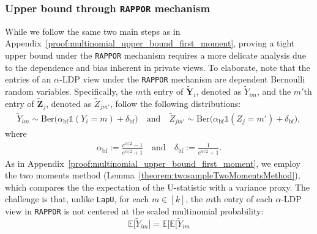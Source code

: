 \documentclass[twoside,11pt]{article}
\newcommand{\rvTwo}{Y}
\newcommand{\rvThree}{Z}
\newcommand{\vectorize}[1]{\mathbf{#1}}
\newcommand{\mE}{\mathbb{E}} %
\newcommand{\sampleIndexOne}{i}
\newcommand{\sampleIndexTwo}{j}
\newcommand{\vectorIndex}{m}
\newcommand{\privacyParameter}{\alpha} %
\newcommand{\privacyParameterrappor}{\privacyParameter_{\mathrm{bf}}}
\newcommand{\smallNumber}{\delta}
\newcommand{\smallNumberrappor}{\smallNumber_{\mathrm{bf}}}
\newcommand{\ilmun}[1]{
	{ \color{blue} Ilmun: #1}
}
\begin{document}
\begin{appendix}
	\subsubsection{Upper bound through \texttt{RAPPOR} mechanism}\label{proof:rappor_optimal}
	While we follow the same two main steps as in Appendix~\ref{proof:multinomial_upper_bound_first_moment}, proving a tight upper bound under the \texttt{RAPPOR} mechanism requires a more delicate analysis due to the dependence and bias inherent in private views. %
	To elaborate, note that the entries of an $\privacyParameter$-LDP view under the \texttt{RAPPOR} mechanism are dependent Bernoulli random variables. Specifically, 
	the $\vectorIndex$th entry of $\tilde{\vectorize{\rvTwo}}_{i}$,
	denoted as $\tilde{\rvTwo}_{\sampleIndexOne \vectorIndex}$, 
	and
	the $\vectorIndex'$th entry of $\tilde{\vectorize{\rvThree}}_{\sampleIndexTwo}$,
	denoted as $\tilde{\rvThree}_{\sampleIndexTwo \vectorIndex'}$, 
	follow the following distributions:
	\begin{align*}
		\tilde{\rvTwo}_{\sampleIndexOne \vectorIndex}
		\sim
		\mathrm{Ber}
		\bigl(
		\privacyParameterrappor \mathds{1}
		(
		\rvTwo_{\sampleIndexOne} = \vectorIndex
		) + \smallNumberrappor
		\bigr)
		\quad \text{and} \quad 
		\tilde{\rvThree}_{\sampleIndexTwo \vectorIndex'}
		\sim
		\mathrm{Ber}
		\bigl(
		\privacyParameterrappor \mathds{1}
		(
		\rvThree_{\sampleIndexTwo} = \vectorIndex'
		) + \smallNumberrappor
		\bigr),
	\end{align*}
	where 
	\begin{align*}
		\privacyParameterrappor := \frac{e^{\privacyParameter /2} -1}{e^{\privacyParameter /2} +1}\quad \text{and} \quad
		\smallNumberrappor := \frac{1}{e^{\privacyParameter /2} +1}.
	\end{align*}
	As in Appendix~\ref{proof:multinomial_upper_bound_first_moment}, we employ the two moments method (Lemma~\ref{theorem:twosampleTwoMomentsMethod}), which compares the the expectation of the U-statistic with a variance proxy.
	The challenge is that, unlike \texttt{LapU}, for each $m \in [k]$, the $m$th entry of each $\privacyParameter$-LDP view in \texttt{RAPPOR} is not centered at the scaled multinomial probability:
	\begin{equation}\label{equation:rappor_expecation}
		\mE
		\bigl[
		\tilde{\rvTwo}_{\sampleIndexOne \vectorIndex}
		\bigr]
		=
		\mE
		\bigl[
		\mE %
		\bigl[
		\tilde{\rvTwo}_{\sampleIndexOne \vectorIndex} %

\end{equation}
\end{appendix}
\end{document}
